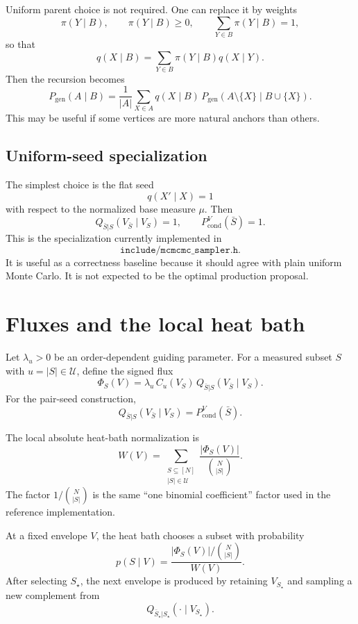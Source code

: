 \documentclass[11pt]{article}
\newcommand{\1}{\mathbf{1}}
\newcommand{\calU}{\mathcal{U}}
\newcommand{\Pgen}{P_{\mathrm{gen}}}
\newcommand{\Pcond}{P_{\mathrm{cond}}}
\newcommand{\card}[1]{\left|#1\right|}
\begin{document}
Uniform parent choice is not required.  One can replace it by weights
\[
  \pi(Y\mid B),\qquad
  \pi(Y\mid B)\ge 0,\qquad
  \sum_{Y\in B}\pi(Y\mid B)=1,
\]
so that
\[
  q(X\mid B)=\sum_{Y\in B}\pi(Y\mid B)q(X\mid Y).
\]
Then the recursion becomes
\[
  \Pgen(A\mid B)
  =
  \frac{1}{\card{A}}
  \sum_{X\in A}
  q(X\mid B)\,
  \Pgen(A\setminus\{X\}\mid B\cup\{X\}).
\]
This may be useful if some vertices are more natural anchors than others.

\subsection{Uniform-seed specialization}

The simplest choice is the flat seed
\[
  q(X'\mid X)=1
\]
with respect to the normalized base measure \(\mu\).  Then
\[
  Q_{\bar S|S}(V_{\bar S}\mid V_S)=1,
  \qquad
  \Pcond^V(\bar S)=1.
\]
This is the specialization currently implemented in
\[
  \texttt{include/mcmcmc\_sampler.h}.
\]
It is useful as a correctness baseline because it should agree with plain
uniform Monte Carlo.  It is not expected to be the optimal production
proposal.

\section{Fluxes and the local heat bath}

Let \(\lambda_u>0\) be an order-dependent guiding parameter.  For a measured
subset \(S\) with \(u=\card{S}\in\calU\), define the signed flux
\[
  \Phi_S(V)
  =
  \lambda_u\,
  C_u(V_S)\,
  Q_{\bar S|S}(V_{\bar S}\mid V_S).
  \label{eq:signed-flux}
\]
For the pair-seed construction,
\[
  Q_{\bar S|S}(V_{\bar S}\mid V_S)
  =
  \Pcond^V(\bar S).
\]

The local absolute heat-bath normalization is
\[
  W(V)
  =
  \sum_{\substack{S\subseteq [N]\\ \card{S}\in\calU}}
  \frac{|\Phi_S(V)|}{\binom{N}{\card{S}}}.
  \label{eq:local-weight}
\]
The factor \(1/\binom{N}{\card{S}}\) is the same ``one binomial coefficient''
factor used in the reference implementation.

At a fixed envelope \(V\), the heat bath chooses a subset with probability
\[
  p(S\mid V)
  =
  \frac{|\Phi_S(V)|/\binom{N}{\card{S}}}{W(V)}.
  \label{eq:subset-choice}
\]
After selecting \(S_\star\), the next envelope is produced by retaining
\(V_{S_\star}\) and sampling a new complement from
\[
  Q_{\bar S_\star|S_\star}(\cdot\mid V_{S_\star}).
\]
\end{document}
